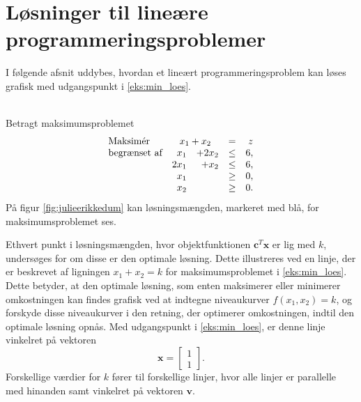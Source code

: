 \section{Løsninger til lineære programmeringsproblemer}
%
%
\label{heeeeejjulle}
%
%
I følgende afsnit uddybes, hvordan et lineært programmeringsproblem kan løses grafisk med udgangspunkt i \ref{eks:min_loes}.
\\\\
\begin{eks}
\label{eks:min_loes}
Betragt maksimumsproblemet
%
\begin{align*}
\begin{array}{lrrlr}
\text{Maksimér}		&	\multicolumn{2}{c}{x_1+x_2} &= &z\\
\text{begrænset af}	&x_1& + 2x_2			&\leq 	& 6,\\
					&2x_1& + x_2			&\leq	& 6,\\
					&x_1&    				&\geq	& 0,\\
					&x_2&    				&\geq	& 0.\\
\end{array}
\end{align*}
%
På figur \ref{fig:julieerikkedum} kan løsningsmængden, markeret med blå, for maksimumsproblemet ses. 
%

%
\end{eks}
%
%
%
Ethvert punkt i løsningsmængden, hvor objektfunktionen $\textbf{c}^T\textbf{x}$ er lig med $k$, undersøges for om disse er den optimale løsning.
Dette illustreres ved en linje, der er beskrevet af ligningen $x_1+x_2=k$ for maksimumsproblemet i \ref{eks:min_loes}. 
Dette betyder, at den optimale løsning, som enten maksimerer eller minimerer omkostningen kan findes grafisk ved at indtegne niveaukurver $f(x_1, x_2)=k$, og forskyde disse niveaukurver i den retning, der optimerer omkostningen, indtil den optimale løsning opnås.  
Med udgangspunkt i \ref{eks:min_loes}, er denne linje vinkelret på vektoren 
%
$$
\textbf{x}=
\begin{bmatrix}
1\\1
\end{bmatrix}.
$$
%
Forskellige værdier for $k$ fører til forskellige linjer, hvor alle linjer er parallelle med hinanden samt vinkelret på vektoren $\textbf{v}$. 
